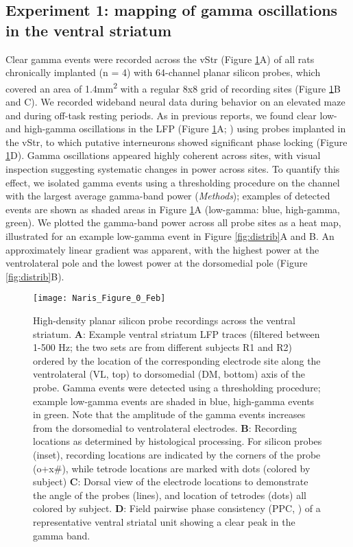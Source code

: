 \documentclass[11pt]{article}
\newcommand{\bsf}[1]{\textbf{#1}}
\let\citeNP=\citealt
\begin{document}
\subsection*{Experiment 1: mapping of gamma oscillations in the
  ventral striatum} 

Clear gamma events were recorded across the vStr (Figure
\ref{fig:trace}A) of all rats chronically implanted (n = 4) with
64-channel planar silicon probes, which covered an area of
1.4mm\textsuperscript{2} with a regular 8x8 grid of recording sites
(Figure \ref{fig:trace}B and C). We recorded wideband neural data
during behavior on an elevated maze and during off-task resting
periods. As in previous reports, we found clear low- and high-gamma
oscillations in the LFP (Figure \ref{fig:trace}A;
\citeNP{Leung1993,Berke2004a,Howe2011}) using probes implanted in the
vStr, to which putative interneurons showed significant phase locking
(Figure \ref{fig:trace}D). Gamma oscillations appeared highly coherent
across sites, with visual inspection suggesting systematic changes in
power across sites. To quantify this effect, we isolated gamma events
using a thresholding procedure on the channel with the largest average
gamma-band power ({\it Methods}); examples of detected events are
shown as shaded areas in Figure \ref{fig:trace}A (low-gamma: blue,
high-gamma, green). We plotted the gamma-band power across all probe
sites as a heat map, illustrated for an example low-gamma event in
Figure \ref{fig:distrib}A and B. An approximately linear gradient was
apparent, with the highest power at the ventrolateral pole and the
lowest power at the dorsomedial pole (Figure \ref{fig:distrib}B).

\begin{figure}[h]
\centering
\texttt{[image: Naris\_Figure\_0\_Feb]}
\caption{High-density planar silicon probe recordings across the
  ventral striatum.  \bsf{A}: Example ventral striatum LFP traces
  (filtered between 1-500 Hz; the two sets are from different subjects
  R1 and R2) ordered by the location of the corresponding electrode
  site along the ventrolateral (VL, top) to dorsomedial (DM, bottom)
  axis of the probe. Gamma events were detected using a thresholding
  procedure; example low-gamma events are shaded in blue, high-gamma
  events in green. Note that the amplitude of the gamma events
  increases from the dorsomedial to ventrolateral electrodes. \bsf{B}:
  Recording locations as determined by histological processing. For
  silicon probes (inset), recording locations are indicated by the
  corners of the probe (o+x\#), while tetrode locations are marked
  with dots (colored by subject) \bsf{C}: Dorsal view of the electrode
  locations to demonstrate the angle of the probes (lines), and
  location of tetrodes (dots) all colored by subject.  \bsf{D}: Field
  pairwise phase consistency (PPC, \protect\citeNP{Vinck2011}) of a
  representative ventral striatal unit showing a clear peak in the
  gamma band.}
\label{fig:trace}
\end{figure}
\end{document}
